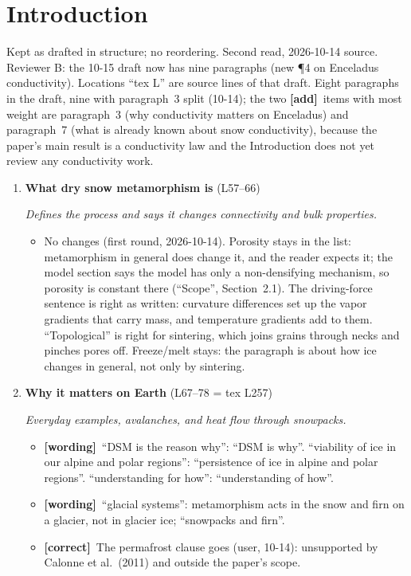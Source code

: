 \documentclass[11pt]{article}
\newcommand{\Pg}[3]{\item \textbf{#1} {\small(#2)}\par\textit{#3}}
\newcommand{\tC}{\textcolor{miss}{\textbf{[correct]}}\ }
\newcommand{\tG}{\textcolor{stale}{\textbf{[wording]}}\ }
\newcommand{\tA}{\textcolor{have}{\textbf{[add]}}\ }
\newcommand{\add}[1]{\textcolor{revB}{#1}}
\begin{document}
\section{Introduction}
Kept as drafted in structure; no reordering. Second read, 2026-10-14 source.
\add{Reviewer B: the 10-15 draft now has nine paragraphs (new \P4 on Enceladus conductivity). Locations ``tex L'' are
source lines of that draft.}
Eight paragraphs in the draft, nine with paragraph~3 split (10-14); the two \tA items with most weight are paragraph~3 (why
conductivity matters on Enceladus) and paragraph~7 (what is already known
about snow conductivity), because the paper's main result is a conductivity
law and the Introduction does not yet review any conductivity work.
\begin{enumerate}
\Pg{What dry snow metamorphism is}{L57--66}{Defines the process and says it changes connectivity and bulk properties.}
  \begin{itemize}
  \item No changes (first round, 2026-10-14). Porosity stays in the list:
    metamorphism in general does change it, and the reader expects it; the
    model section says the model has only a non-densifying mechanism, so
    porosity is constant there (``Scope'', Section~2.1). The driving-force
    sentence is right as written: curvature differences set up the vapor
    gradients that carry mass, and temperature gradients add to them.
    ``Topological'' is right for sintering, which joins grains through necks
    and pinches pores off. Freeze/melt stays: the paragraph is about how ice
    changes in general, not only by sintering.
  \end{itemize}
\Pg{Why it matters on Earth}{L67--78 \add{= tex L257}}{Everyday examples, avalanches, and heat flow through snowpacks.}
  \begin{itemize}
  \item \tG ``DSM is the reason why'': ``DSM is why''. ``viability of ice in
    our alpine and polar regions'': ``persistence of ice in alpine and polar
    regions''. ``understanding for how'': ``understanding of how''.
  \item \tG ``glacial systems'': metamorphism acts in the snow and firn on a
    glacier, not in glacier ice; ``snowpacks and firn''.
  \item \tC The permafrost clause goes (user, 10-14): unsupported by Calonne
    et al.\ (2011) and outside the paper's scope.

\end{itemize}
\end{enumerate}
\end{document}
